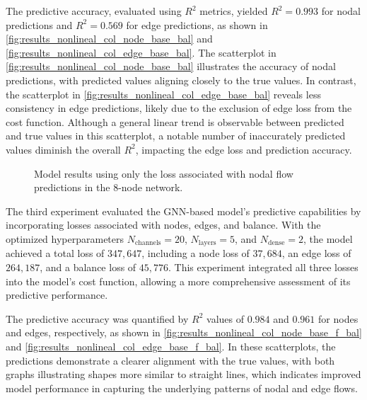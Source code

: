 The predictive accuracy, evaluated using \( R^2 \) metrics, yielded \( R^2 = 0.993 \) for nodal predictions and \( R^2 = 0.569 \) for edge predictions, as shown in \cref{fig:results_nonlineal_col_node_base_bal} and \cref{fig:results_nonlineal_col_edge_base_bal}. The scatterplot in \cref{fig:results_nonlineal_col_node_base_bal} illustrates the accuracy of nodal predictions, with predicted values aligning closely to the true values. In contrast, the scatterplot in \cref{fig:results_nonlineal_col_edge_base_bal} reveals less consistency in edge predictions, likely due to the exclusion of edge loss from the cost function. Although a general linear trend is observable between predicted and true values in this scatterplot, a notable number of inaccurately predicted values diminish the overall \( R^2 \), impacting the edge loss and prediction accuracy.




\begin{figure}
    \centering
    \setlength{}        
    \setlength{} 
    
    \caption{Model results using only the loss associated with nodal flow predictions in the 8-node network.}
    \label{fig:col_base_bal_results_non_lineal}
\end{figure}




The third experiment evaluated the GNN-based model's predictive capabilities by incorporating losses associated with nodes, edges, and balance. With the optimized hyperparameters \( N_{\text{channels}} = 20 \), \( N_{\text{layers}} = 5 \), and \( N_{\text{dense}} = 2 \), the model achieved a total loss of \( 347,647 \), including a node loss of \( 37,684 \), an edge loss of \( 264,187 \), and a balance loss of \( 45,776 \). This experiment integrated all three losses into the model's cost function, allowing a more comprehensive assessment of its predictive performance.

The predictive accuracy was quantified by \( R^2 \) values of \( 0.984 \) and \( 0.961 \) for nodes and edges, respectively, as shown in \cref{fig:results_nonlineal_col_node_base_f_bal} and \cref{fig:results_nonlineal_col_edge_base_f_bal}. In these scatterplots, the predictions demonstrate a clearer alignment with the true values, with both graphs illustrating shapes more similar to straight lines, which indicates improved model performance in capturing the underlying patterns of nodal and edge flows.

